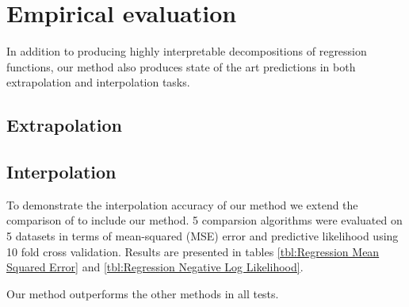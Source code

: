 \documentclass[twoside]{article}
\begin{document}

\section{Empirical evaluation}

In addition to producing highly interpretable decompositions of regression functions, our method also produces state of the art predictions in both extrapolation and interpolation tasks.

\subsection{Extrapolation}


\subsection{Interpolation}

To demonstrate the interpolation accuracy of our method we extend the comparison of \cite{duvenaud2011additive11} to include our method.
5 comparsion algorithms were evaluated on 5 datasets in terms of mean-squared (MSE) error and predictive likelihood using 10 fold cross validation.
Results are presented in tables \ref{tbl:Regression Mean Squared Error} and \ref{tbl:Regression Negative Log Likelihood}.
%


%
Our method outperforms the other methods in all tests.

\end{document}
